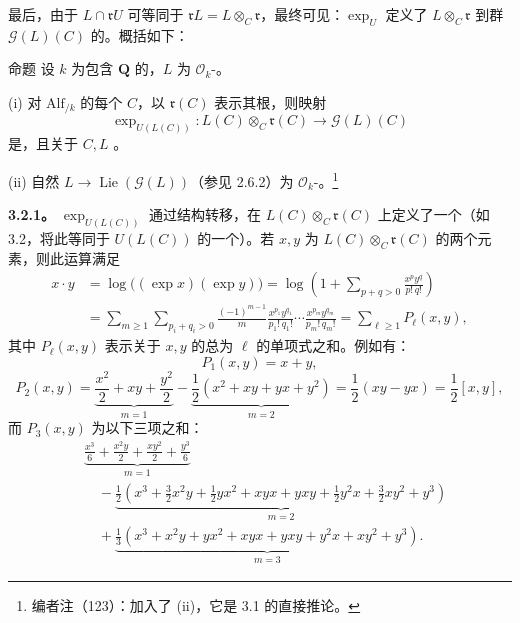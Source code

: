 最后，由于 $L\cap\mathfrak rU$ 可等同于 $\mathfrak rL=L\otimes_C\mathfrak r$，最终可见：$\exp_U$ 定义了 $L\otimes_C\mathfrak r$ 到群 $\mathscr G(L)(C)$ 的。概括如下：
\begin{SGAresult}{命题}{}
设 $k$ 为包含 $\mathbf Q$ 的，$L$ 为 $\mathscr O_k$-。

(i) 对 $\mathrm{Alf}_{/k}$ 的每个 $C$，以 $\mathfrak r(C)$ 表示其根，则映射
\[
\exp_{U(L(C))}:L(C)\otimes_C\mathfrak r(C)\longrightarrow\mathscr G(L)(C)
\]
是，且关于 $C,L$ 。

(ii) 自然 $L\to\operatorname{Lie}(\mathscr G(L))$（参见 2.6.2）为 $\mathscr O_k$-。\footnote{编者注（123）：加入了 (ii)，它是 3.1 的直接推论。}
\end{SGAresult}

\textbf{3.2.1。}  $\exp_{U(L(C))}$ 通过结构转移，在 $L(C)\otimes_C\mathfrak r(C)$ 上定义了一个（如 3.2，将此等同于 $U(L(C))$ 的一个）。若 $x,y$ 为 $L(C)\otimes_C\mathfrak r(C)$ 的两个元素，则此运算满足
\[
\begin{aligned}
x\cdot y&=\log\bigl((\exp x)(\exp y)\bigr)
=\log\left(1+\sum_{p+q>0}\frac{x^py^q}{p!\,q!}\right)\\
&=\sum_{m\geq1}\sum_{p_i+q_i>0}\frac{(-1)^{m-1}}m\frac{x^{p_1}y^{q_1}}{p_1!\,q_1!}\cdots\frac{x^{p_m}y^{q_m}}{p_m!\,q_m!}
=\sum_{\ell\geq1}P_\ell(x,y),
\end{aligned}
\]
其中 $P_\ell(x,y)$ 表示关于 $x,y$ 的总为 $\ell$ 的单项式之和。例如有：
\[
P_1(x,y)=x+y,
\]
\[
P_2(x,y)=\underbrace{\frac{x^2}2+xy+\frac{y^2}2}_{m=1}
-\underbrace{\frac12(x^2+xy+yx+y^2)}_{m=2}
=\frac12(xy-yx)=\frac12[x,y],
\]
而 $P_3(x,y)$ 为以下三项之和：
\[
\begin{aligned}
{}&\underbrace{\frac{x^3}6+\frac{x^2y}2+\frac{xy^2}2+\frac{y^3}6}_{m=1}\\
&\quad-\underbrace{\frac12\left(x^3+\frac32x^2y+\frac12yx^2+xyx+yxy+\frac12y^2x+\frac32xy^2+y^3\right)}_{m=2}\\
&\quad+\underbrace{\frac13(x^3+x^2y+yx^2+xyx+yxy+y^2x+xy^2+y^3)}_{m=3}.
\end{aligned}
\]

